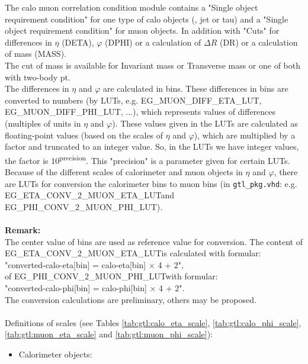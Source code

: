 The calo muon correlation condition module contains a "Single object requirement condition" for one type of calo objects (\egamma, jet or tau) and a "Single object requirement condition" for muon objects.
In addition with "Cuts" for differences in $\eta$ (DETA), $\varphi$ (DPHI) or a calculation of $\Delta$$R$ (DR) or a calculation of mass (MASS).\\
The cut of mass is available for Invariant mass or Transverse mass or one of both with two-body pt.\\
The differences in $\eta$ and $\varphi$ are calculated in bins. These differences in bins are converted to numbers (by LUTs, e.g. \small{EG\_MUON\_DIFF\_ETA\_LUT, EG\_MUON\_DIFF\_PHI\_LUT}\normalsize, ...),
which represents values of differences (multiples of units in $\eta$ and $\varphi$).
These values given in the LUTs are calculated as floating-point values (based on the scales of $\eta$ and $\varphi$), which are multiplied by a factor and truncated to an integer value.
So, in the LUTs we have integer values, the factor is 10\textsuperscript{\tiny{precision}\normalsize}. This "precision" is a parameter given for certain LUTs.\\
Because of the different scales of calorimeter and muon objects in $\eta$ and $\varphi$, there are LUTs for conversion the calorimeter bins to muon bins (in \texttt{gtl\_pkg.vhd}:
 e.g. \small{EG\_ETA\_CONV\_2\_MUON\_ETA\_LUT}\normalsize and \small{EG\_PHI\_CONV\_2\_MUON\_PHI\_LUT}\normalsize).\\\\
\textbf{Remark:}\\
The center value of bins are used as reference value for conversion.
The content of \small{EG\_ETA\_CONV\_2\_MUON\_ETA\_LUT}\normalsize is calculated with formular:\\ "converted-calo-eta[bin] = calo-eta[bin] $\times$ 4 + 2",\\
of \small{EG\_PHI\_CONV\_2\_MUON\_PHI\_LUT}\normalsize with formular:\\
"converted-calo-phi[bin] = calo-phi[bin] $\times$ 4 + 2".\\
The conversion calculations are preliminary, others may be proposed.\\\\
Definitions of scales (see Tables \ref{tab:gtl:calo_eta_scale}, \ref{tab:gtl:calo_phi_scale}, \ref{tab:gtl:muon_eta_scale} and \ref{tab:gtl:muon_phi_scale}):
\begin{itemize}
\item Calorimeter objects:

\end{itemize}$$
